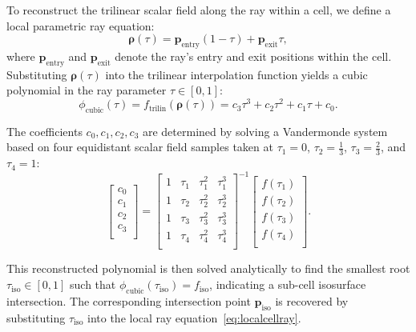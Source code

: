 \documentclass[conference]{IEEEtran}
\begin{document}
To reconstruct the trilinear scalar field along the ray within a cell, we define a local parametric ray equation:
\begin{equation}
\boldsymbol{\rho}(\tau) = \mathbf{p}_{\text{entry}} (1 - \tau) + \mathbf{p}_{\text{exit}} \tau,
\label{eq:localcellray}
\end{equation}
where \( \mathbf{p}_{\text{entry}} \) and \( \mathbf{p}_{\text{exit}} \) denote the ray's entry and exit positions within the cell. Substituting \( \boldsymbol{\rho}(\tau) \) into the trilinear interpolation function yields a cubic polynomial in the ray parameter \( \tau \in [0, 1] \):
\begin{equation}
\phi_{\text{cubic}}(\tau) = f_{\text{trilin}}(\boldsymbol{\rho}(\tau)) = c_3 \tau^3 + c_2 \tau^2 + c_1 \tau + c_0.
\end{equation}

The coefficients \( c_0, c_1, c_2, c_3 \) are determined by solving a Vandermonde system based on four equidistant scalar field samples taken at \( \tau_1 = 0 \), \( \tau_2 = \tfrac{1}{3} \), \( \tau_3 = \tfrac{2}{3} \), and \( \tau_4 = 1 \):
\begin{equation}
\begin{bmatrix}
c_0 \\
c_1 \\
c_2 \\
c_3 \\
\end{bmatrix}
=
\begin{bmatrix}
1 & \tau_1 & \tau_1^2 & \tau_1^3 \\
1 & \tau_2 & \tau_2^2 & \tau_2^3 \\
1 & \tau_3 & \tau_3^2 & \tau_3^3 \\
1 & \tau_4 & \tau_4^2 & \tau_4^3 \\
\end{bmatrix}^{-1}
\begin{bmatrix}
f(\tau_1) \\
f(\tau_2) \\
f(\tau_3) \\
f(\tau_4) \\
\end{bmatrix}.
\end{equation}

This reconstructed polynomial is then solved analytically to find the smallest root \( \tau_{\text{iso}} \in [0,1] \) such that \( \phi_{\text{cubic}}(\tau_{\text{iso}}) = f_{\text{iso}} \), indicating a sub-cell isosurface intersection. The corresponding intersection point \( \mathbf{p}_{\text{iso}} \) is recovered by substituting \( \tau_{\text{iso}} \) into the local ray equation~\eqref{eq:localcellray}.
\end{document}
